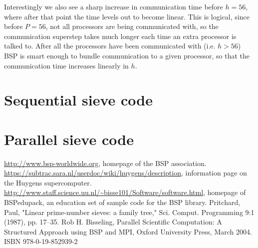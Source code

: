 \documentclass[a4paper]{article}
\begin{document}
Interestingly we also see a sharp increase in communication time before $h=56$,
where after that point the time levels out to become linear. This is logical,
since before $P=56$, not all processors are being communicated with, so the
communication superstep takes much longer each time an extra processor is talked
to. After all the processors have been communicated with (i.e. $h>56$) BSP is
smart enough to bundle communication to a given processor, so that the
communication time increases linearly in $h$. 



\appendix
\section{Sequential sieve code}\label{app:seq}


\section{Parallel sieve code}\label{app:par}



\begin{thebibliography}{99}
     \url{http://www.bsp-worldwide.org}, homepage of the BSP
        association. 
        \url{https://subtrac.sara.nl/userdoc/wiki/huygens/description},
        information page on the Huygens supercomputer. 
        \url{http://www.staff.science.uu.nl/~bisse101/Software/software.html}, homepage of BSPedupack, an education set of sample code for the
        BSP library. 
     Pritchard, Paul, "Linear prime-number sieves: a family tree," Sci. Comput. Programming 9:1 (1987), pp. 17–35.
     Rob H. Bisseling, Parallel Scientific Computation: A Structured Approach using BSP and MPI, Oxford University Press, March 2004. ISBN 978-0-19-852939-2
\end{thebibliography}
\end{document}
